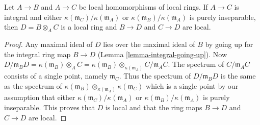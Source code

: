 \begin{lemma}
\label{lemma-local-tensor-with-integral}
Let $A \to B$ and $A \to C$ be local homomorphisms of local rings.
If $A \to C$ is integral and either
$\kappa(\mathfrak m_C)/\kappa(\mathfrak m_A)$ or
$\kappa(\mathfrak m_B)/\kappa(\mathfrak m_A)$ is purely
inseparable, then $D = B \otimes_A C$ is a local ring and
$B \to D$ and $C \to D$ are local.
\end{lemma}

\begin{proof}
Any maximal ideal of $D$ lies over the maximal ideal of $B$ by
going up for the integral ring map
$B \to D$ (Lemma \ref{lemma-integral-going-up}).
Now $D/\mathfrak m_B D = \kappa(\mathfrak m_B) \otimes_A C =
\kappa(\mathfrak m_B) \otimes_{\kappa(\mathfrak m_A)} C/\mathfrak m_A C$.
The spectrum of $C/\mathfrak m_A C$ consists of a
single point, namely $\mathfrak m_C$. Thus the spectrum of
$D/\mathfrak m_B D$ is the same as the spectrum of
$\kappa(\mathfrak m_B) \otimes_{\kappa(\mathfrak m_A)} \kappa(\mathfrak m_C)$
which is a single point by our assumption that either
$\kappa(\mathfrak m_C)/\kappa(\mathfrak m_A)$ or
$\kappa(\mathfrak m_B)/\kappa(\mathfrak m_A)$ is purely
inseparable. This proves that $D$ is local and that the ring maps
$B \to D$ and $C \to D$ are local.
\end{proof}
